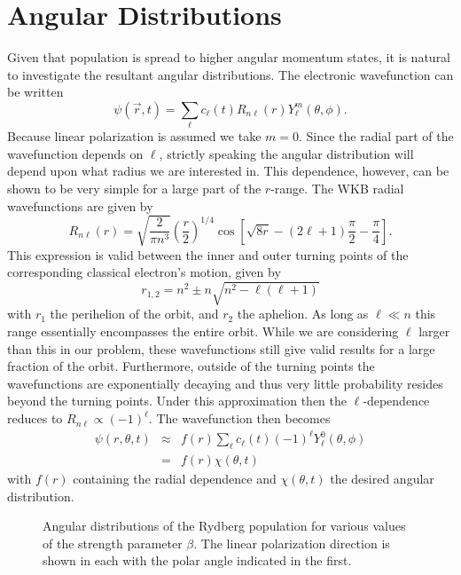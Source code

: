 \section{Angular Distributions}
\hspace{\parindent}

Given that population is spread to higher angular momentum states, it is
natural to investigate the resultant angular distributions.  The
electronic wavefunction can be written
\begin{equation}
\psi(\vec{r},t) = \sum_{\ell} c_{\ell}(t) R_{n \ell}(r)
Y_{\ell}^{m}(\theta,\phi).
\end{equation}
Because linear polarization is assumed we take $m=0$.  Since the radial part
of the wavefunction depends on $\ell$, strictly speaking the angular
distribution will depend upon what radius we are interested in.  This
dependence, however, can be shown to be very simple for a large part of the
$r$-range.  The WKB radial wavefunctions are given by \cite{Bethe_Salpeter}
\begin{equation}
R_{n \ell}(r) = \sqrt{\frac{2}{\pi n^3}}\left(\frac{r}{2}\right)^{1/4} \cos
\left[\sqrt{8 r} - (2 \ell +1)\frac{\pi}{2} - \frac{\pi}{4}\right].
\end{equation}
This expression is valid between the inner and outer turning points of the
corresponding classical electron's motion, given by
\begin{equation}
r_{1,2} = n^2 \pm n\sqrt{n^2 - \ell (\ell+1)}
\end{equation}
with $r_1$ the perihelion of the orbit, and $r_2$ the aphelion.  As long as
$\ell \ll n$ this range essentially encompasses the entire orbit.  While we are
considering $\ell$ larger than this in our problem, these wavefunctions still
give valid results for a large fraction of the orbit.  Furthermore,
outside of the turning points the wavefunctions are exponentially decaying
and thus very little probability resides beyond the turning points.  Under this
approximation then the $\ell$-dependence reduces to
$R_{n \ell} \propto (-1)^{\ell}$.  The wavefunction then becomes
\begin{eqnarray}
\psi(r,\theta,t) &\approx& f(r) \sum_{\ell} c_{\ell}(t) (-1)^{\ell}
Y_{\ell}^{0}(\theta,\phi) \\
& = & f(r) \chi(\theta,t)
\end{eqnarray}
with $f(r)$ containing the radial dependence and $\chi(\theta,t)$ the desired
angular distribution.

\begin{figure}[tbp]
\bigskip
{} {Angular distributions of the Rydberg
population for various values of the strength parameter $\beta$.  The linear
polarization direction is shown in each with the polar angle indicated in the
first.
\label{angular}}
\end{figure}

